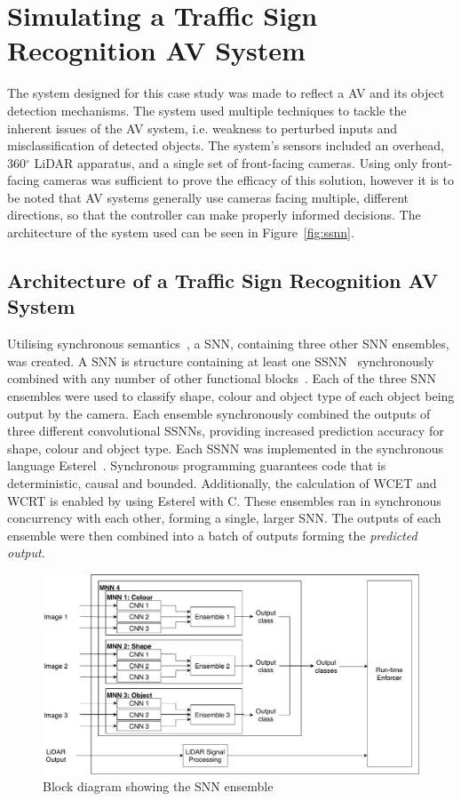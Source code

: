 \section{Simulating a Traffic Sign Recognition AV System}
The system designed for this case study was made to reflect a \acf{AV} and its object detection mechanisms. 
The system used multiple techniques to tackle the inherent issues of the \ac{AV} system, i.e. weakness to perturbed inputs and misclassification of detected objects.
The system's sensors included an overhead, 360$^\circ$ \acf{LiDAR} apparatus, and a single set of front-facing cameras.
Using only front-facing cameras was sufficient to prove the efficacy of this solution, however it is to be noted that \ac{AV} systems generally use cameras facing multiple, different directions, so that the controller can make properly informed decisions.
The architecture of the system used can be seen in Figure~\ref{fig:ssnn}. 

\subsection{Architecture of a Traffic Sign Recognition AV System}
Utilising synchronous semantics~\cite{benveniste2003synchronous}, a \acf{SNN}, containing three other \ac{SNN} ensembles, was created.
A \ac{SNN} is structure containing at least one \acf{SSNN}~\cite{sann} synchronously combined with any number of other functional blocks~\cite{sann}.
Each of the three \ac{SNN} ensembles were used to classify shape, colour and object type of each object being output by the camera.
Each ensemble synchronously combined the outputs of three different convolutional \acp{SSNN}, providing increased prediction accuracy for shape, colour and object type. 
Each \ac{SSNN} was implemented in the synchronous language Esterel~\cite{Esterel}.
Synchronous programming guarantees code that is deterministic, causal and bounded.
Additionally, the calculation of \acf{WCET} and \acf{WCRT} is enabled by using Esterel with C.
These ensembles ran in synchronous concurrency with each other, forming a single, larger \ac{SNN}. 
The outputs of each ensemble were then combined into a batch of outputs forming the \textit{predicted output}.

\begin{figure}[ht]
	\centering
	\includegraphics[width=\textwidth]{Content/fig/MNN.pdf}
	\caption{Block diagram showing the \acf{SNN} ensemble} \label{fig:mnn}
\end{figure}

